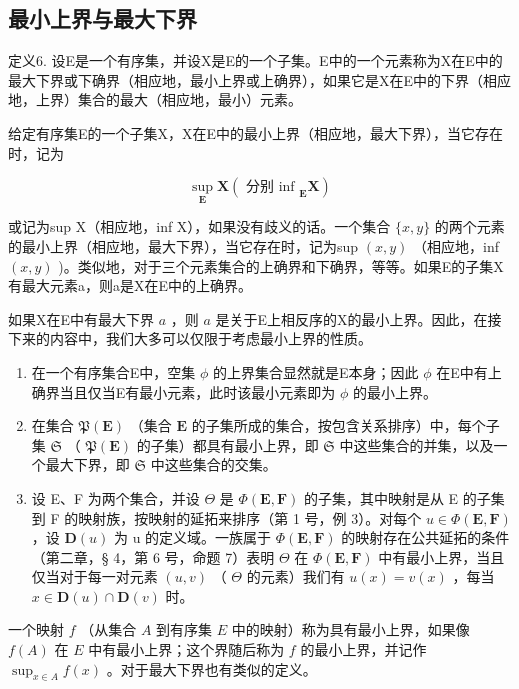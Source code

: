 \subsection{最小上界与最大下界}

定义6. 设E是一个有序集，并设X是E的一个子集。E中的一个元素称为X在E中的最大下界或下确界（相应地，最小上界或上确界），如果它是X在E中的下界（相应地，上界）集合的最大（相应地，最小）元素。

给定有序集E的一个子集X，X在E中的最小上界（相应地，最大下界），当它存在时，记为

\[
\sup _ {\mathbf {E}} \mathbf {X} (\text { 分别   inf } _ {\mathbf {E}} \mathbf {X})
\]

或记为sup X（相应地，inf X），如果没有歧义的话。一个集合 \(\{x, y\}\) 的两个元素的最小上界（相应地，最大下界），当它存在时，记为sup \((x, y)\) （相应地，inf \((x, y)\) )。类似地，对于三个元素集合的上确界和下确界，等等。如果E的子集X有最大元素a，则a是X在E中的上确界。

如果X在E中有最大下界 \(a\) ，则 \(a\) 是关于E上相反序的X的最小上界。因此，在接下来的内容中，我们大多可以仅限于考虑最小上界的性质。


\begin{enumerate}
\def\labelenumi{(\arabic{enumi})}
\item
  在一个有序集合E中，空集 \(\phi\) 的上界集合显然就是E本身；因此 \(\phi\) 在E中有上确界当且仅当E有最小元素，此时该最小元素即为 \(\phi\) 的最小上界。
\item
  在集合 \(\mathfrak{P}(\mathbf{E})\) （集合 \(\mathbf{E}\) 的子集所成的集合，按包含关系排序）中，每个子集 \(\mathfrak{S}\) （ \(\mathfrak{P}(\mathbf{E})\) 的子集）都具有最小上界，即 \(\mathfrak{S}\) 中这些集合的并集，以及一个最大下界，即 \(\mathfrak{S}\) 中这些集合的交集。
\item
  设 E、F 为两个集合，并设 \(\Theta\) 是 \(\Phi(\mathbf{E}, \mathbf{F})\) 的子集，其中映射是从 E 的子集到 F 的映射族，按映射的延拓来排序（第 1 号，例 3）。对每个 \(u \in \Phi(\mathbf{E}, \mathbf{F})\) ，设 \(\mathbf{D}(u)\) 为 u 的定义域。一族属于 \(\Phi(\mathbf{E}, \mathbf{F})\) 的映射存在公共延拓的条件（第二章，§ 4，第 6 号，命题 7）表明 \(\Theta\) 在 \(\Phi(\mathbf{E}, \mathbf{F})\) 中有最小上界，当且仅当对于每一对元素 \((u, v)\) （ \(\Theta\) 的元素）我们有 \(u(x) = v(x)\) ，每当 \(x \in \mathbf{D}(u) \cap \mathbf{D}(v)\) 时。
\end{enumerate}

一个映射 \(f\) （从集合 \(A\) 到有序集 \(E\) 中的映射）称为具有最小上界，如果像 \(f(A)\) 在 \(E\) 中有最小上界；这个界随后称为 \(f\) 的最小上界，并记作 \(\sup_{x \in A} f(x)\) 。对于最大下界也有类似的定义。

